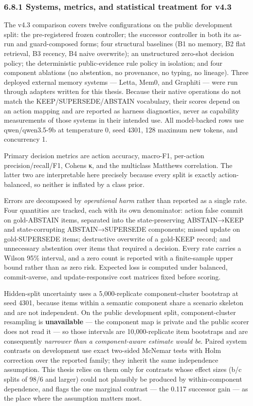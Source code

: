\subsubsection{6.8.1 Systems, metrics, and statistical treatment for
v4.3}\label{systems-metrics-and-statistical-treatment-for-v4.3}

The v4.3 comparison covers twelve configurations on the public
development split: the pre-registered frozen controller; the successor
controller in both its as-run and guard-composed forms; four structural
baselines (B1 no memory, B2 flat retrieval, B3 recency, B4 naive
overwrite); an unstructured zero-shot decision policy; the deterministic
public-evidence rule policy in isolation; and four component ablations
(no abstention, no provenance, no typing, no lineage). Three deployed
external memory systems --- Letta, Mem0, and Graphiti --- were run
through adapters written for this thesis. Because their native
operations do not match the KEEP/SUPERSEDE/ABSTAIN vocabulary, their
scores depend on an action mapping and are reported as harness
diagnostics, never as capability measurements of those systems in their
intended use. All model-backed rows use qwen/qwen3.5-9b at temperature
0, seed 4301, 128 maximum new tokens, and concurrency 1.

Primary decision metrics are action accuracy, macro-F1, per-action
precision/recall/F1, Cohen\textquotesingle s κ, and the multiclass
Matthews correlation. The latter two are interpretable here precisely
because every split is exactly action-balanced, so neither is inflated
by a class prior.

Errors are decomposed by \emph{operational harm} rather than reported as
a single rate. Four quantities are tracked, each with its own
denominator: action false commit on gold-ABSTAIN items, separated into
the state-preserving ABSTAIN→KEEP and state-corrupting ABSTAIN→SUPERSEDE
components; missed update on gold-SUPERSEDE items; destructive overwrite
of a gold-KEEP record; and unnecessary abstention over items that
required a decision. Every rate carries a Wilson 95\% interval, and a
zero count is reported with a finite-sample upper bound rather than as
zero risk. Expected loss is computed under balanced, commit-averse, and
update-responsive cost matrices fixed before scoring.

Hidden-split uncertainty uses a 5,000-replicate component-cluster
bootstrap at seed 4301, because items within a semantic component share
a scenario skeleton and are not independent. On the public development
split, component-cluster resampling is \textbf{unavailable} --- the
component map is private and the public scorer does not read it --- so
those intervals are 10,000-replicate item bootstraps and are
consequently \emph{narrower than a component-aware estimate would be}.
Paired system contrasts on development use exact two-sided McNemar tests
with Holm correction over the reported family; they inherit the same
independence assumption. This thesis relies on them only for contrasts
whose effect sizes (b/c splits of 98/6 and larger) could not plausibly
be produced by within-component dependence, and flags the one marginal
contrast --- the 0.117 successor gain --- as the place where the
assumption matters most.

